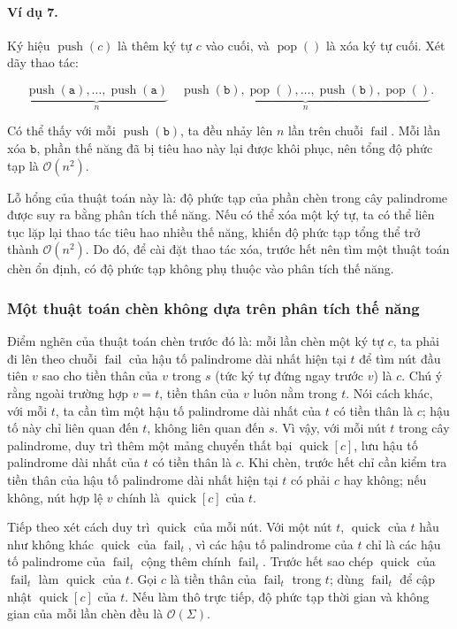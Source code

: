 \documentclass[11pt]{article}
\newcommand{\Oh}{\mathcal{O}}
\begin{document}
\paragraph{Ví dụ 7.}
Ký hiệu \(\operatorname{push}(c)\) là thêm ký tự \(c\) vào cuối, và
\(\operatorname{pop}()\) là xóa ký tự cuối. Xét dãy thao tác:

\[
\underbrace{\operatorname{push}(\texttt{a}),\ldots,
\operatorname{push}(\texttt{a})}_{n}\quad
\underbrace{\operatorname{push}(\texttt{b}),\operatorname{pop}(),\ldots,
\operatorname{push}(\texttt{b}),\operatorname{pop}()}_{n}.
\]

Có thể thấy với mỗi \(\operatorname{push}(\texttt{b})\), ta đều nhảy lên
\(n\) lần trên chuỗi \(\operatorname{fail}\). Mỗi lần xóa \(\texttt{b}\), phần
thế năng đã bị tiêu hao này lại được khôi phục, nên tổng độ phức tạp là
\(\Oh(n^2)\).

Lỗ hổng của thuật toán này là: độ phức tạp của phần chèn trong cây palindrome
được suy ra bằng phân tích thế năng. Nếu có thể xóa một ký tự, ta có thể liên
tục lặp lại thao tác tiêu hao nhiều thế năng, khiến độ phức tạp tổng thể trở
thành \(\Oh(n^2)\). Do đó, để cài đặt thao tác xóa, trước hết nên tìm một
thuật toán chèn ổn định, có độ phức tạp không phụ thuộc vào phân tích thế
năng.

\subsubsection{Một thuật toán chèn không dựa trên phân tích thế năng}

Điểm nghẽn của thuật toán chèn trước đó là: mỗi lần chèn một ký tự \(c\), ta
phải đi lên theo chuỗi \(\operatorname{fail}\) của hậu tố palindrome dài nhất
hiện tại \(t\) để tìm nút đầu tiên \(v\) sao cho tiền thân của \(v\) trong
\(s\) (tức ký tự đứng ngay trước \(v\)) là \(c\). Chú ý rằng ngoài trường hợp
\(v=t\), tiền thân của \(v\) luôn nằm trong \(t\). Nói cách khác, với mỗi
\(t\), ta cần tìm một hậu tố palindrome dài nhất của \(t\) có tiền thân là
\(c\); hậu tố này chỉ liên quan đến \(t\), không liên quan đến \(s\). Vì vậy,
với mỗi nút \(t\) trong cây palindrome, duy trì thêm một mảng chuyển thất bại
\(\operatorname{quick}[c]\), lưu hậu tố palindrome dài nhất của \(t\) có tiền
thân là \(c\). Khi chèn, trước hết chỉ cần kiểm tra tiền thân của hậu tố
palindrome dài nhất hiện tại \(t\) có phải \(c\) hay không; nếu không, nút hợp
lệ \(v\) chính là \(\operatorname{quick}[c]\) của \(t\).

Tiếp theo xét cách duy trì \(\operatorname{quick}\) của mỗi nút. Với một nút
\(t\), \(\operatorname{quick}\) của \(t\) hầu như không khác
\(\operatorname{quick}\) của \(\operatorname{fail}_t\), vì các hậu tố
palindrome của \(t\) chỉ là các hậu tố palindrome của \(\operatorname{fail}_t\)
cộng thêm chính \(\operatorname{fail}_t\). Trước hết sao chép
\(\operatorname{quick}\) của \(\operatorname{fail}_t\) làm
\(\operatorname{quick}\) của \(t\). Gọi \(c\) là tiền thân của
\(\operatorname{fail}_t\) trong \(t\); dùng \(\operatorname{fail}_t\) để cập
nhật \(\operatorname{quick}[c]\) của \(t\). Nếu làm thô trực tiếp, độ phức tạp
thời gian và không gian của mỗi lần chèn đều là \(\Oh(\Sigma)\).
\end{document}

